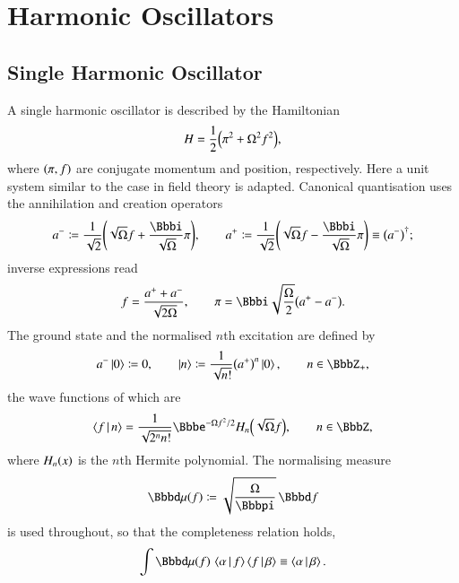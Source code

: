 \chapter{Harmonic Oscillators}
\label{chap:harosc}

\section{Single Harmonic Oscillator}
\label{sec:single-harosc}

A single harmonic oscillator is described by the Hamiltonian
\begin{equation}
H = \frac{1}{2}{\left(\pi^2 + \Omega^2f^2\right)},
\label{eq:hamiltonian-simple-harosc}
\end{equation}
where ${\left(\pi, f\right)}$ are conjugate momentum and position, respectively. Here
a unit system similar to the case in field theory is adapted. Canonical
quantisation uses the annihilation and creation operators
\begin{equation}
a^- \coloneqq \frac{1}{\sqrt{2}}\rbr{\sqrt{\Omega}f + 
\frac{\ii}{\sqrt{\Omega}}\pi}, \qquad
a^+ \coloneqq \frac{1}{\sqrt{2}}\rbr{\sqrt{\Omega}f
-\frac{\ii}{\sqrt{\Omega}}\pi} \equiv \rbr{a^-}^\dagger;
\end{equation}
inverse expressions read
\begin{equation}
f = \frac{a^++a^-}{\sqrt{2\Omega}},\qquad
\pi = \ii\sqrt{\frac{\Omega}{2}}\rbr{a^+-a^-}.
\end{equation}
The ground state and the normalised $n$th excitation are defined by
\begin{equation}
a^-\Ket{0} \coloneqq 0,\qquad
\Ket{n} \coloneqq \frac{1}{\sqrt{n!}}\rbr{a^+}^n\Ket{0},\qquad
n \in \BbbZ_+,
\end{equation}
the wave functions of which are
\begin{equation}
\Braket{f | n} = \frac{1}{\sqrt{2^n n!}} 
\ee^{-\Omega f^2/2} \rfun{H_n}{\sqrt{\Omega}f}, \qquad
n \in \BbbZ,
\end{equation}
where ${H_n}\mathopen{}\left(x\right)\mathclose{}$ is the $n$th Hermite polynomial. The normalising measure
\begin{equation}
\rfun{\dd \mu}{f} \coloneqq \sqrt{\frac{\Omega}{\pp}}\,\dd f
\end{equation}
is used throughout, so that the completeness relation holds,
\begin{align}
\int \rfun{\dd \mu}{f}\,\Braket{\alpha | f}\Braket{f | \beta} \equiv
\Braket{\alpha | \beta}.
\end{align}

